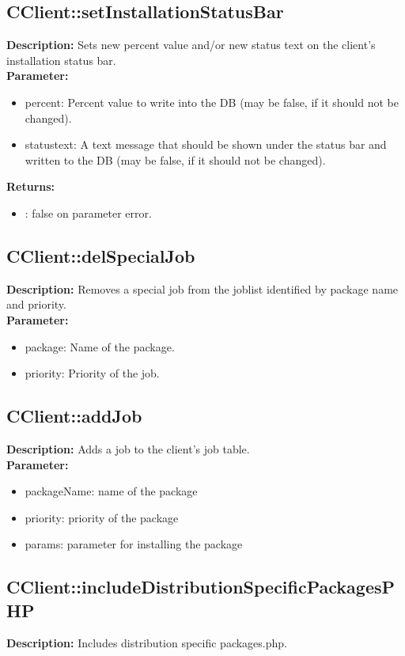 \subsection{CClient::setInstallationStatusBar}
\textbf{Description:} Sets new percent value and/or new status text on the client's installation status bar.\\
\textbf{Parameter:}
\begin{itemize}
\item percent: Percent value to write into the DB (may be false, if it should not be changed).
\item statustext: A text message that should be shown under the status bar and written to the DB (may be false, if it should not be changed).
\end{itemize}
\textbf{Returns:}
\begin{itemize}
\item : false on parameter error.
\end{itemize}

\subsection{CClient::delSpecialJob}
\textbf{Description:} Removes a special job from the joblist identified by package name and priority.\\
\textbf{Parameter:}
\begin{itemize}
\item package: Name of the package.
\item priority: Priority of the job.
\end{itemize}

\subsection{CClient::addJob}
\textbf{Description:} Adds a job to the client's job table.\\
\textbf{Parameter:}
\begin{itemize}
\item packageName: name of the package
\item priority: priority of the package
\item params: parameter for installing the package
\end{itemize}

\subsection{CClient::includeDistributionSpecificPackagesPHP}
\textbf{Description:} Includes distribution specific packages.php.\\

